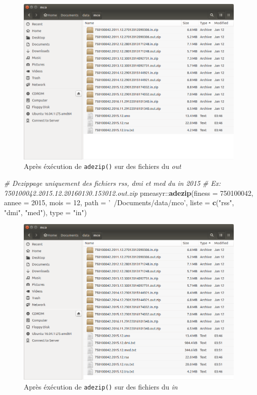 \documentclass[]{book}
\newenvironment{Shaded}{\begin{snugshade}}{\end{snugshade}}
\newcommand{\KeywordTok}[1]{\textcolor[rgb]{0.13,0.29,0.53}{\textbf{{#1}}}}
\newcommand{\DataTypeTok}[1]{\textcolor[rgb]{0.13,0.29,0.53}{{#1}}}
\newcommand{\DecValTok}[1]{\textcolor[rgb]{0.00,0.00,0.81}{{#1}}}
\newcommand{\StringTok}[1]{\textcolor[rgb]{0.31,0.60,0.02}{{#1}}}
\newcommand{\CommentTok}[1]{\textcolor[rgb]{0.56,0.35,0.01}{\textit{{#1}}}}
\newcommand{\NormalTok}[1]{{#1}}
\begin{document}
\begin{figure}[htbp]
\centering
\includegraphics{images/archives_dezip.png}
\caption{Après éxécution de \texttt{adezip()} sur des fichiers du
\emph{out}}
\end{figure}

\begin{Shaded}
\begin{Highlighting}[]
\CommentTok{# Dezippage uniquement des fichiers rss, dmi et med du in 2015}
\CommentTok{# Ex: 750100042.2015.12.20160130.153012.out.zip}
\NormalTok{pmeasyr::}\KeywordTok{adezip}\NormalTok{(}\DataTypeTok{finess =} \DecValTok{750100042}\NormalTok{, }
                \DataTypeTok{annee =} \DecValTok{2015}\NormalTok{, }
                \DataTypeTok{mois =} \DecValTok{12}\NormalTok{, }
                \DataTypeTok{path =} \StringTok{'~/Documents/data/mco'}\NormalTok{, }
                \DataTypeTok{liste =} \KeywordTok{c}\NormalTok{(}\StringTok{"rss"}\NormalTok{, }\StringTok{"dmi"}\NormalTok{, }\StringTok{"med"}\NormalTok{), }
                \DataTypeTok{type =} \StringTok{"in"}\NormalTok{)}
\end{Highlighting}
\end{Shaded}

\begin{figure}[htbp]
\centering
\includegraphics{images/archives_mco_in.png}
\caption{Après éxécution de \texttt{adezip()} sur des fichiers du
\emph{in}}
\end{figure}
\end{document}
